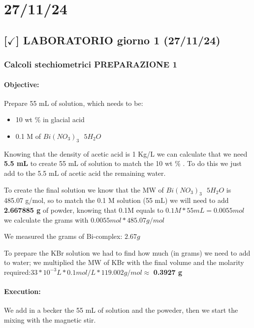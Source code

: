 \section{27/11/24}

\subsection{[$\checkmark$] LABORATORIO giorno 1 (27/11/24)}

\subsubsection{Calcoli stechiometrici PREPARAZIONE 1}

\paragraph{Objective:} Prepare 55 mL of solution, which needs to be:
\begin{itemize}
    \item 10 wt \% in glacial acid
    \item 0.1 M of $Bi(NO_3)_3 \text{ } 5H_2O$
\end{itemize}  

\noindent Knowing that the density of acetic acid is 1 Kg/L we can calculate that we need \textbf{5.5 mL} to create 55 mL of solution to match the 10 wt \% . To do this we just add to the 5.5 mL
of acetic acid the remaining water.

\vspace{10pt}

\noindent To create the final solution we know that the MW of $Bi(NO_3)_3 \text{ } 5H_2O$ is 485.07 g/mol, so to match the 0.1 M solution (55 mL) we will need to add \textbf{2.667885 g} of powder, knowing that 0.1M equals to $0.1 M * 55 mL = 0.0055 mol$ we calculate the grams with $0.0055 mol * 485.07 g/mol$

\vspace{10pt}

\noindent We measured the grams of Bi-complex: $2.67 g$

\vspace{10pt}

\noindent To prepare the KBr solution we had to find how much (in grams) we need to add to water; we multiplied the MW of KBr with the final volume and the molarity required:$33*10^{-3} L * 0.1 mol/L * 119.002 g/mol \approx$ \textbf{0.3927 g}

\paragraph{Execution:} We add in a becker the 55 mL of solution and the poweder, then we start the mixing with the magnetic stir.

